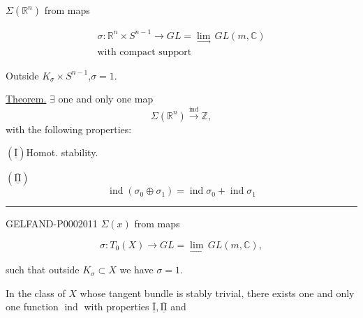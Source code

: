 $\Sigma (\mathbb R^n)$ from maps



\begin{gather*}
\sigma\colon\mathbb R^n\times S^{n-1}\longrightarrow GL
=\underset{\longrightarrow}{\lim}\, GL (m,\mathbb C)\\
\text{with compact support}
\end{gather*}



Outside $K_\sigma\times S^{n-1}$,\quad$\sigma=1$.



\Needspace{45mm}
\underline{Theorem.} $\exists$ one and only one map
\begin{equation*}\Sigma (\mathbb R^n)\overset{\operatorname{ind}}{\longrightarrow}\mathbb Z,\end{equation*}
with the following properties:



$(\overline{\underline{\mathrm I}})$\quad Homot. stability.



$(\overline{\underline{\mathrm{II}}})$
\begin{equation*}\operatorname{ind}(\sigma_0\oplus\sigma_1)=\operatorname{ind}\sigma_0+\operatorname{ind}\sigma_1\end{equation*}



\par\noindent\rule{\linewidth}{.3pt}\par



\begin{GelfandAdjacentEvidence}{GELFAND-P000201}{1}
$\Sigma (x)$ from maps
\end{GelfandAdjacentEvidence}

\begin{equation*}\sigma\colon T_0(X)\longrightarrow GL=\underset{\longrightarrow}{\lim}\, GL (m,\mathbb C),\end{equation*}



such that outside $K_\sigma\subset X$ we have $\sigma=1$.



In the class of $X$ whose tangent bundle is stably trivial,
there exists one and only one function $\operatorname{ind}$ with properties $\overline{\underline{\mathrm I}},\overline{\underline{\mathrm{II}}}$ and



